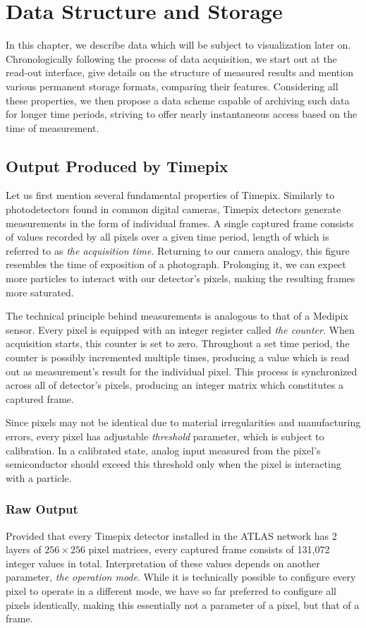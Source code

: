 \chapter{Data Structure and Storage}
In this chapter, we describe data which will be subject to visualization later on. Chronologically following the process of data acquisition, we start out at the read-out interface, give details on the structure of measured results and mention various permanent storage formats, comparing their features. Considering all these properties, we then propose a data scheme capable of archiving such data for longer time periods, striving to offer nearly instantaneous access based on the time of measurement.


\section{Output Produced by Timepix}
Let us first mention several fundamental properties of Timepix. Similarly to photodetectors found in common digital cameras, Timepix detectors generate measurements in the form of individual frames. A single captured frame consists of values recorded by all pixels over a given time period, length of which is referred to as \textit{the acquisition time}. Returning to our camera analogy, this figure resembles the time of exposition of a photograph. Prolonging it, we can expect more particles to interact with our detector's pixels, making the resulting frames more saturated.

The technical principle behind measurements is analogous to that of a Medipix sensor. Every pixel is equipped with an integer register called \textit{the counter}. When acquisition starts, this counter is set to zero. Throughout a set time period, the counter is possibly incremented multiple times, producing a value which is read out as measurement's result for the individual pixel. This process is synchronized across all of detector's pixels, producing an integer matrix which constitutes a captured frame.

Since pixels may not be identical due to material irregularities and manufacturing errors, every pixel has adjustable \textit{threshold} parameter, which is subject to calibration. In a calibrated state, analog input measured from the pixel's semiconductor should exceed this threshold only when the pixel is interacting with a particle.


\subsection{Raw Output}
Provided that every Timepix detector installed in the ATLAS network has 2 layers of $256 \times 256$ pixel matrices, every captured frame consists of 131,072 integer values in total. Interpretation of these values depends on another parameter, \textit{the operation mode}. While it is technically possible to configure every pixel to operate in a different mode, we have so far preferred to configure all pixels identically, making this essentially not a parameter of a pixel, but that of a frame.

